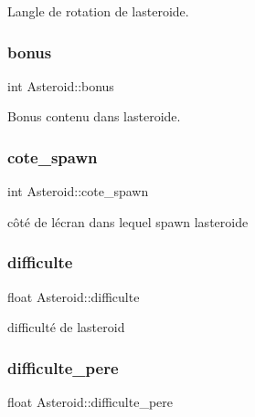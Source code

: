 L\textquotesingle{}angle de rotation de l\textquotesingle{}asteroide. 

\mbox{\label{struct_asteroid_a7cccabaead9b22abbb00bbcfb1f200b5}} 
\subsubsection{\texorpdfstring{bonus}{bonus}}
{\footnotesize\ttfamily int Asteroid\+::bonus}



Bonus contenu dans l\textquotesingle{}asteroide. 

\mbox{\label{struct_asteroid_ad22a8ef78c1ce52730fb286c525663db}} 
\subsubsection{\texorpdfstring{cote\+\_\+spawn}{cote\_spawn}}
{\footnotesize\ttfamily int Asteroid\+::cote\+\_\+spawn}



côté de l\textquotesingle{}écran dans lequel spawn l\textquotesingle{}asteroide 

\mbox{\label{struct_asteroid_a06f6075025efc690d9df3e4446811aa9}} 
\subsubsection{\texorpdfstring{difficulte}{difficulte}}
{\footnotesize\ttfamily float Asteroid\+::difficulte}



difficulté de l\textquotesingle{}asteroid 

\mbox{\label{struct_asteroid_ac935b81631199a1ac20ef87fff684025}} 
\subsubsection{\texorpdfstring{difficulte\+\_\+pere}{difficulte\_pere}}
{\footnotesize\ttfamily float Asteroid\+::difficulte\+\_\+pere}



